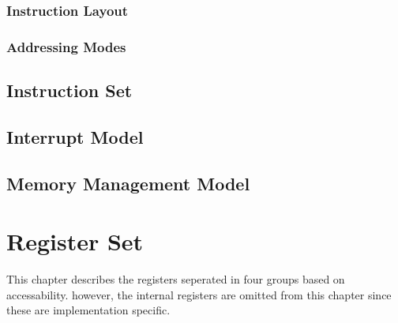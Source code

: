 \documentclass[oneside, a4paper]{memoir}
\begin{document}
\subsection{Instruction Layout}
\subsection{Addressing Modes}
\section{Instruction Set}
\section{Interrupt Model}
\section{Memory Management Model}

\chapter{Register Set}
This chapter describes the registers seperated in four groups based on accessability. however, the internal registers are omitted from this chapter since these are implementation specific.
\end{document}
